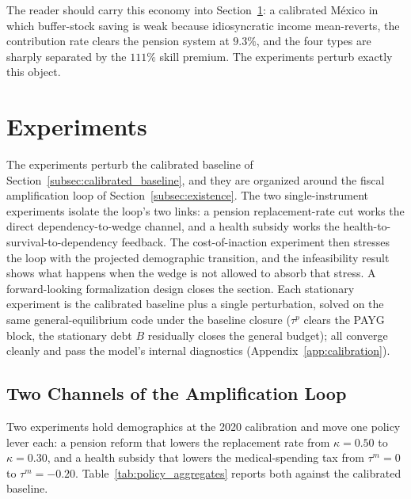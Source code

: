 \documentclass[12pt,a4paper]{article}
\begin{document}
The reader should carry this economy into Section~\ref{sec:experiments}: a calibrated M\'exico in which buffer-stock saving is weak because idiosyncratic income mean-reverts, the contribution rate clears the pension system at $9.3\%$, and the four types are sharply separated by the $111\%$ skill premium. The experiments perturb exactly this object.


\section{Experiments}
\label{sec:experiments}
\label{sec:policy}

The experiments perturb the calibrated baseline of Section~\ref{subsec:calibrated_baseline}, and they are organized around the fiscal amplification loop of Section~\ref{subsec:existence}. The two single-instrument experiments isolate the loop's two links: a pension replacement-rate cut works the direct dependency-to-wedge channel, and a health subsidy works the health-to-survival-to-dependency feedback. The cost-of-inaction experiment then stresses the loop with the projected demographic transition, and the infeasibility result shows what happens when the wedge is not allowed to absorb that stress. A forward-looking formalization design closes the section. Each stationary experiment is the calibrated baseline plus a single perturbation, solved on the same general-equilibrium code under the baseline closure ($\tau^p$ clears the PAYG block, the stationary debt $B$ residually closes the general budget); all converge cleanly and pass the model's internal diagnostics (Appendix~\ref{app:calibration}).

\subsection{Two Channels of the Amplification Loop}
\label{subsec:exp_kappa_taum}

Two experiments hold demographics at the 2020 calibration and move one policy lever each: a pension reform that lowers the replacement rate from $\kappa=0.50$ to $\kappa=0.30$, and a health subsidy that lowers the medical-spending tax from $\tau^m=0$ to $\tau^m=-0.20$. Table~\ref{tab:policy_aggregates} reports both against the calibrated baseline.
\end{document}
